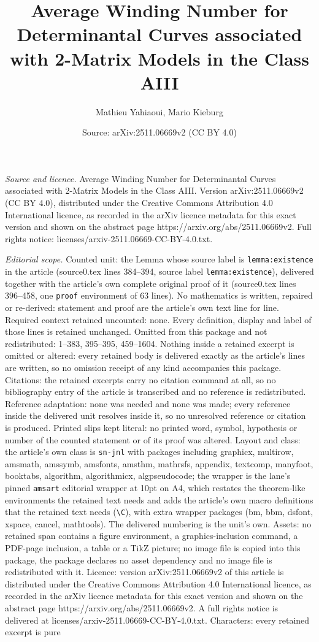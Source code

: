 \documentclass[10pt,a4paper]{amsart}
\title[Average Winding Number for Determinantal Curves associated w]{Average Winding Number for Determinantal Curves associated with 2-Matrix Models in the Class AIII}
\author{Mathieu Yahiaoui, Mario Kieburg}
\date{Source: arXiv:2511.06669v2 (CC BY 4.0)}
\begin{document}
\maketitle

\noindent\emph{Source and licence.} Average Winding Number for Determinantal Curves associated with 2-Matrix Models in the Class AIII. Version arXiv:2511.06669v2 (CC BY 4.0), distributed under the Creative Commons Attribution 4.0 International licence, as recorded in the arXiv licence metadata for this exact version and shown on the abstract page https://arxiv.org/abs/2511.06669v2. Full rights notice: licenses/arxiv-2511.06669-CC-BY-4.0.txt.\par\smallskip

\noindent\textit{Editorial scope.} Counted unit: the Lemma whose source label is \texttt{lemma:existence} in the article (source0.tex lines 384--394, source label \texttt{lemma:existence}), delivered together with the article's own complete original proof of it (source0.tex lines 396--458, one \texttt{proof} environment of 63 lines). No mathematics is written, repaired or re-derived: statement and proof are the article's own text line for line. Required context retained uncounted: none. Every definition, display and label of those lines is retained unchanged. Omitted from this package and not redistributed: 1--383, 395--395, 459--1604. Nothing inside a retained excerpt is omitted or altered: every retained body is delivered exactly as the article's lines are written, so no omission receipt of any kind accompanies this package. Citations: the retained excerpts carry no citation command at all, so no bibliography entry of the article is transcribed and no reference is redistributed. Reference adaptation: none was needed and none was made; every reference inside the delivered unit resolves inside it, so no unresolved reference or citation is produced. Printed slips kept literal: no printed word, symbol, hypothesis or number of the counted statement or of its proof was altered. Layout and class: the article's own class is \texttt{sn-jnl} with packages including graphicx, multirow, amsmath, amssymb, amsfonts, amsthm, mathrsfs, appendix, textcomp, manyfoot, booktabs, algorithm, algorithmicx, algpseudocode; the wrapper is the lane's pinned \texttt{amsart} editorial wrapper at 10pt on A4, which restates the theorem-like environments the retained text needs and adds the article's own macro definitions that the retained text needs (\texttt{\textbackslash C}), with extra wrapper packages (bm, bbm, dsfont, xspace, cancel, mathtools). The delivered numbering is the unit's own. Assets: no retained span contains a figure environment, a graphics-inclusion command, a PDF-page inclusion, a table or a TikZ picture; no image file is copied into this package, the package declares no asset dependency and no image file is redistributed with it. Licence: version arXiv:2511.06669v2 of this article is distributed under the Creative Commons Attribution 4.0 International licence, as recorded in the arXiv licence metadata for this exact version and shown on the abstract page https://arxiv.org/abs/2511.06669v2. A full rights notice is delivered at licenses/arxiv-2511.06669-CC-BY-4.0.txt. Characters: every retained excerpt is pure 
\end{document}
